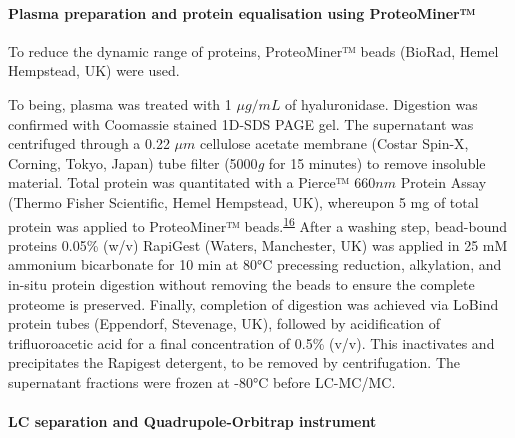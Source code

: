 \documentclass[
]{article}
\begin{document}
\hypertarget{plasma-preparation-and-protein-equalisation-using-proteominer}{%
\paragraph{Plasma preparation and protein equalisation using ProteoMiner™}\label{plasma-preparation-and-protein-equalisation-using-proteominer}}

To reduce the dynamic range of proteins, ProteoMiner™ beads (BioRad, Hemel Hempstead, UK) were used.

To being, plasma was treated with 1 \(\mu g/mL\) of hyaluronidase.
Digestion was confirmed with Coomassie stained 1D-SDS PAGE gel.
The supernatant was centrifuged through a 0.22 \(\mu m\) cellulose acetate membrane (Costar Spin-X, Corning, Tokyo, Japan) tube filter (5000\emph{g} for 15 minutes) to remove insoluble material.
Total protein was quantitated with a Pierce™ \(660 nm\) Protein Assay (Thermo Fisher Scientific, Hemel Hempstead, UK), whereupon 5 mg of total protein was applied to ProteoMiner™ beads.\textsuperscript{\protect\hyperlink{ref-stoscheck_protein_1987}{16}}
After a washing step, bead-bound proteins 0.05\% (w/v) RapiGest (Waters, Manchester, UK) was applied in 25 mM ammonium bicarbonate for 10 min at 80°C precessing reduction, alkylation, and in-situ protein digestion without removing the beads to ensure the complete proteome is preserved.
Finally, completion of digestion was achieved via LoBind protein tubes (Eppendorf, Stevenage, UK), followed by acidification of trifluoroacetic acid for a final concentration of 0.5\% (v/v).
This inactivates and precipitates the Rapigest detergent, to be removed by centrifugation.
The supernatant fractions were frozen at -80°C before LC-MC/MC.

\hypertarget{lc-separation-and-quadrupole-orbitrap-instrument}{%
\paragraph{LC separation and Quadrupole-Orbitrap instrument}\label{lc-separation-and-quadrupole-orbitrap-instrument}}
\end{document}
